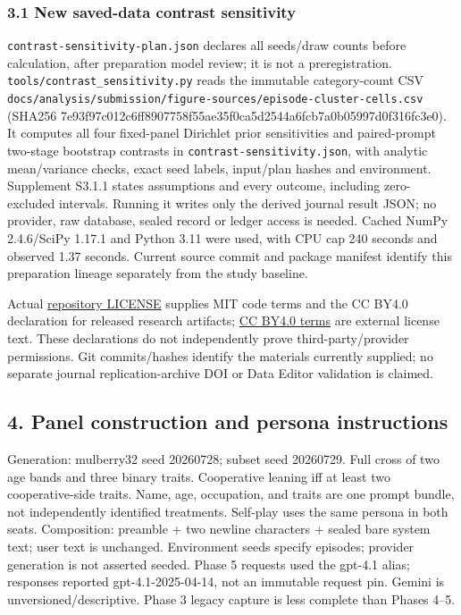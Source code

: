 \documentclass[11pt]{article}
\begin{document}
\subsubsection{3.1 New saved-data contrast
sensitivity}\label{new-saved-data-contrast-sensitivity}

\texttt{contrast-sensitivity-plan.json} declares all seeds/draw counts
before calculation, after preparation model review; it is not a
preregistration. \texttt{tools/contrast\_sensitivity.py} reads the
immutable category-count CSV
\nolinkurl{docs/analysis/submission/figure-sources/episode-cluster-cells.csv}
(SHA256
7e93f97c012c6ff8907758f55ae35f0ca5d2544a6fcb7a0b05997d0f316fc3e0). It
computes all four fixed-panel Dirichlet prior sensitivities and
paired-prompt two-stage bootstrap contrasts in
\texttt{contrast-sensitivity.json}, with analytic mean/variance checks,
exact seed labels, input/plan hashes and environment. Supplement S3.1.1
states assumptions and every outcome, including zero-excluded intervals.
Running it writes only the derived journal result JSON; no provider, raw
database, sealed record or ledger access is needed. Cached NumPy
2.4.6/SciPy 1.17.1 and Python 3.11 were used, with CPU cap 240 seconds
and observed 1.37 seconds. Current source commit and package manifest
identify this preparation lineage separately from the study baseline.

Actual
\href{https://github.com/yoheinakajima/synthetic-players/blob/62ab90beff1d291b069c87f13b6b6b3495171ddd/LICENSE}{repository
LICENSE} supplies MIT code terms and the CC BY4.0 declaration for
released research artifacts;
\href{https://creativecommons.org/licenses/by/4.0/}{CC BY4.0 terms} are
external license text. These declarations do not independently prove
third-party/provider permissions. Git commits/hashes identify the
materials currently supplied; no separate journal replication-archive
DOI or Data Editor validation is claimed.

\subsection{4. Panel construction and persona
instructions}\label{panel-construction-and-persona-instructions}

Generation: mulberry32 seed 20260728; subset seed 20260729. Full cross
of two age bands and three binary traits. Cooperative leaning iff at
least two cooperative-side traits. Name, age, occupation, and traits are
one prompt bundle, not independently identified treatments. Self-play
uses the same persona in both seats. Composition: preamble + two newline
characters + sealed bare system text; user text is unchanged.
Environment seeds specify episodes; provider generation is not asserted
seeded. Phase 5 requests used the gpt-4.1 alias; responses reported
gpt-4.1-2025-04-14, not an immutable request pin. Gemini is
unversioned/descriptive. Phase 3 legacy capture is less complete than
Phases 4--5.
\end{document}
